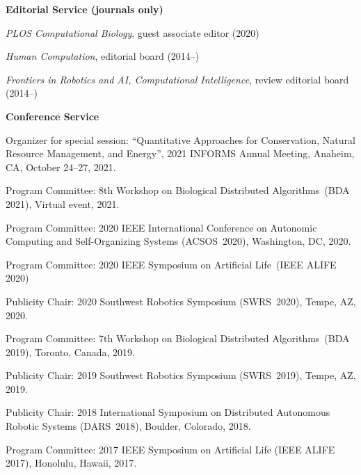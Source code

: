 \documentclass[10pt]{article}           %
\newlength{\bibbulletindent}
\newcommand{\halfblankline}{\quad\vspace{-0.5\baselineskip}\pagebreak[3]}
\begin{document}
\halfblankline

\textbf{Editorial Service (journals only)}
\begin{cvlist}
    \item \emph{PLOS Computational Biology}, guest associate editor (2020)
    \item \emph{Human Computation}, editorial board (2014--)
    \item \emph{Frontiers in Robotics and AI, Computational Intelligence}, review editorial board (2014--)
\end{cvlist}

\halfblankline

\textbf{Conference Service}
\begin{bibsection}[label=\enskip\textbullet,leftmargin=\bibbulletindent]
    \item Organizer for special session: ``Quantitative Approaches for
        Conservation, Natural Resource Management, and Energy'', 2021
        INFORMS Annual Meeting, Anaheim, CA, October 24--27, 2021.

    \item Program Committee: 8th Workshop on Biological Distributed
        Algorithms~(BDA 2021), Virtual event, 2021.

    \item Program Committee: 2020 IEEE International Conference on
        Autonomic Computing and Self-Organizing Systems (ACSOS~2020),
        Washington, DC, 2020.

    \item Program Committee: 2020 IEEE Symposium on Artificial
        Life~(IEEE ALIFE 2020)

    \item Publicity Chair: 2020 Southwest Robotics Symposium
        (SWRS~2020), Tempe, AZ, 2020.

    \item Program Committee: 7th Workshop on Biological Distributed
        Algorithms~(BDA 2019), Toronto, Canada, 2019.

    \item Publicity Chair: 2019 Southwest Robotics Symposium
        (SWRS~2019), Tempe, AZ, 2019.

    \item Publicity Chair: 2018 International Symposium on Distributed
        Autonomous Robotic Systems (DARS~2018), Boulder, Colorado, 2018.

    \item Program Committee: 2017 IEEE Symposium on Artificial Life
        (IEEE ALIFE 2017), Honolulu, Hawaii, 2017.


\end{bibsection}
\end{document}
